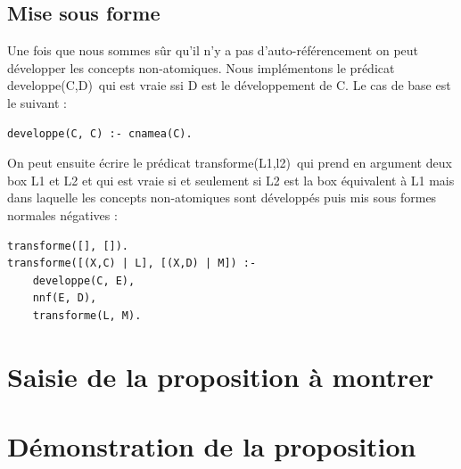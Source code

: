\documentclass[12pt]{article}
\begin{document}
\subsection{Mise sous forme}
Une fois que nous sommes sûr qu'il n'y a pas d'auto-référencement on peut développer les concepts non-atomiques. Nous implémentons le prédicat \color{blue}developpe(C,D)\color{black}\ qui est vraie ssi D est le développement de C. Le cas de base est le suivant : 
\begin{verbatim}
developpe(C, C) :- cnamea(C).
\end{verbatim}
On peut ensuite écrire le prédicat \color{blue}transforme(L1,l2)\color{black}\ qui prend en argument deux box L1 et L2 et qui est vraie si et seulement si L2 est la box équivalent à L1 mais dans laquelle les concepts non-atomiques sont développés puis mis sous formes normales négatives :
\begin{verbatim}
transforme([], []).
transforme([(X,C) | L], [(X,D) | M]) :- 
	developpe(C, E),
	nnf(E, D),
	transforme(L, M).
\end{verbatim}
\section{Saisie de la proposition à montrer}
\section{Démonstration de la proposition}
\end{document}
